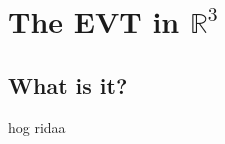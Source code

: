 
\setcounter{chapter}{0}
\chapter{The EVT in $\mathbb{R}^3$}

\section{What is it?}
\begin{definition}
	hog ridaa
\end{definition}